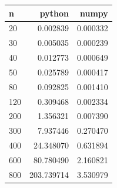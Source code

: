 \begin{tabular}{lrr}
\hline
n & python & numpy \\
\hline
20 & 0.002839 & 0.000332 \\
30 & 0.005035 & 0.000239 \\
40 & 0.012773 & 0.000649 \\
50 & 0.025789 & 0.000417 \\
80 & 0.092825 & 0.001410 \\
120 & 0.309468 & 0.002334 \\
200 & 1.356321 & 0.007390 \\
300 & 7.937446 & 0.270470 \\
400 & 24.348070 & 0.631894 \\
600 & 80.780490 & 2.160821 \\
800 & 203.739714 & 3.530979 \\
\hline
\end{tabular}
